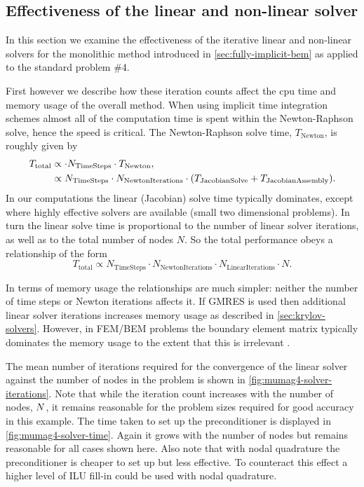 \subsection{Effectiveness of the linear and non-linear solver}
\label{sec:effect-line-non}

In this section we examine the effectiveness of the iterative linear and non-linear solvers for the monolithic method introduced in \cref{sec:fully-implicit-bem} as applied to the \mumag standard problem \#4.

First however we describe how these iteration counts affect the cpu time and memory usage of the overall method.
When using implicit time integration schemes almost all of the computation time is spent within the Newton-Raphson solve, hence the speed is critical.
The Newton-Raphson solve time, $T_\mathrm{Newton}$, is roughly given by
\begin{equation}
  \begin{aligned}
    T_\mathrm{total} &\propto \cdot N_\mathrm{TimeSteps} \cdot T_\mathrm{Newton}, \\
                     &\propto N_\mathrm{TimeSteps} \cdot N_\mathrm{NewtonIterations} \cdot {\left(  T_\mathrm{JacobianSolve} + T_\mathrm{JacobianAssembly} \right)}.
  \end{aligned}
\end{equation}
In our computations the linear (Jacobian) solve time typically dominates, except where highly effective solvers are available (\ie small two dimensional problems).
In turn the linear solve time is proportional to the number of linear solver iterations, as well as to the total number of nodes $N$.
So the total performance obeys a relationship of the form
\begin{equation}
  T_\mathrm{total} \propto N_\mathrm{TimeSteps} \cdot N_\mathrm{NewtonIterations} \cdot N_\mathrm{LinearIterations} \cdot N.
\end{equation}

In terms of memory usage the relationships are much simpler: neither the number of time steps or Newton iterations affects it.
If GMRES is used then additional linear solver iterations increases memory usage as described in \cref{sec:krylov-solvers}.
However, in FEM/BEM problems the boundary element matrix typically dominates the memory usage to the extent that this is irrelevant \cite{Suess2002}.

The mean number of iterations required for the convergence of the linear solver against the number of nodes in the problem is shown in \cref{fig:mumag4-solver-iterations}.
Note that while the iteration count increases with the number of nodes, $N$, it remains reasonable for the problem sizes required for good accuracy in this example.
The time taken to set up the preconditioner is displayed in \cref{fig:mumag4-solver-time}.
Again it grows with the number of nodes but remains reasonable for all cases shown here.
Also note that with nodal quadrature the preconditioner is cheaper to set up but less effective.
To counteract this effect a higher level of ILU fill-in could be used with nodal quadrature.

